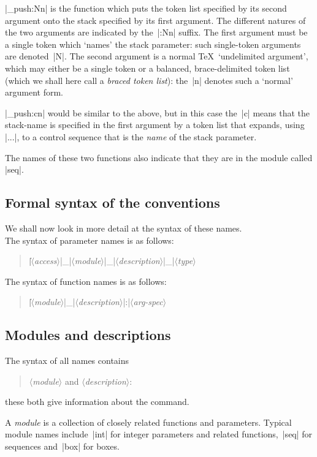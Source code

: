 \documentclass{article}
\providecommand \m [1]{$\langle$\textit{#1}$\rangle$}
\begin{document}
|\seq_push:Nn| is the function which puts the token list specified by
its second argument onto the stack specified by its first argument.
The different natures of the two arguments are indicated by the~|:Nn|
suffix. The first argument must be a single token which `names'
the stack parameter: such single-token arguments are denoted~|N|.
The second argument is a normal \TeX\ `undelimited argument', which
may either be a single token or a balanced, brace-delimited token
list (which we shall here call a \textit{braced token list}): the~|n|
denotes such a `normal' argument form.

|\seq_push:cn| would be similar to the above, but in this case the~|c|
means that the stack-name is specified in the first argument by a
token list that expands, using |\csname...|, to a control sequence that
is the \emph{name} of the stack parameter.

\noindent
The names of these two functions also indicate that they are in the
module called |seq|.


\subsection{Formal syntax of the conventions}
\label{sec:namesyn}

We shall now look in more detail at the syntax of these names.\\
The syntax of parameter names is as follows:
 \begin{quote}
   |\|\m{access}|_|\m{module}|_|\m{description}|_|\m{type}
 \end{quote}
The syntax of function names is as follows:
 \begin{quote}
   |\|\m{module}|_|\m{description}|:|\m{arg-spec}
 \end{quote}


\subsection{Modules and descriptions}
\label{sec:modules}

The syntax of all names contains
\begin{quote}
  \m{module} and \m{description}:  
\end{quote}
these both give information about the command.

A \textit{module} is a collection of 
closely related functions and parameters.
Typical module names include~|int| for integer parameters
and related functions,~|seq| for sequences and~|box| for boxes.
\end{document}
